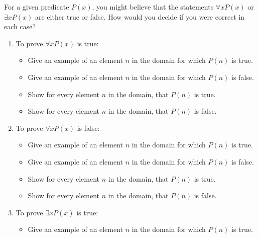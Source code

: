 \documentclass[11pt,]{book}
\theoremstyle{ptxplainnotitle}
\theoremstyle{ptxplaintitle}
\theoremstyle{ptxdefinitionnotitle}
\theoremstyle{ptxdefinitiontitle}
\theoremstyle{ptxdefinitionnotitle}
\theoremstyle{ptxdefinitiontitle}
\theoremstyle{ptxdefinitionnotitle}
\theoremstyle{ptxdefinitiontitle}
\theoremstyle{ptxdefinitiontitlenonumber}
\theoremstyle{ptxdefinitiontitlenonumber}
\numberwithin{equation}{chapter}
\begin{document}
\begin{divisionexercise}{9}\hypertarget{exercise-157}{}
\hypertarget{p-2088}{}%
For a given predicate \(P(x)\text{,}\) you might believe that the statements \(\forall x P(x)\) or \(\exists x P(x)\) are either true or false.  How would you decide if you were correct in each case? \leavevmode%
\begin{enumerate}[label=\alph*.]
\item\hypertarget{li-1032}{}\hypertarget{p-2089}{}%
To prove \(\forall x P(x)\) is true: \par
\begin{itemize}[label=$\odot$,leftmargin=3em,]
\item{}\hypertarget{p-2090}{}%
Give an example of an element \(n\) in the domain for which \(P(n)\) is true.%

\item{}\hypertarget{p-2091}{}%
Give an example of an element \(n\) in the domain for which \(P(n)\) is false.%

\item{}\hypertarget{p-2092}{}%
Show for every element \(n\) in the domain, that \(P(n)\) is true.%

\item{}\hypertarget{p-2093}{}%
Show for every element \(n\) in the domain, that \(P(n)\) is false.%

\end{itemize}
%
\item\hypertarget{li-1037}{}\hypertarget{p-2094}{}%
To prove \(\forall x P(x)\) is false:%
\par
\hypertarget{p-2095}{}%
\par
\begin{itemize}[label=$\odot$,leftmargin=3em,]
\item{}\hypertarget{p-2096}{}%
Give an example of an element \(n\) in the domain for which \(P(n)\) is true.%

\item{}\hypertarget{p-2097}{}%
Give an example of an element \(n\) in the domain for which \(P(n)\) is false.%

\item{}\hypertarget{p-2098}{}%
Show for every element \(n\) in the domain, that \(P(n)\) is true.%

\item{}\hypertarget{p-2099}{}%
Show for every element \(n\) in the domain, that \(P(n)\) is false.%

\end{itemize}
%
\item\hypertarget{li-1042}{}\hypertarget{p-2100}{}%
To prove \(\exists x P(x)\) is true:%
\par
\hypertarget{p-2101}{}%
\par
\begin{itemize}[label=$\odot$,leftmargin=3em,]
\item{}\hypertarget{p-2102}{}%
Give an example of an element \(n\) in the domain for which \(P(n)\) is true.%


\end{itemize}
\end{enumerate}
\end{divisionexercise}
\end{document}
